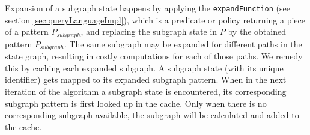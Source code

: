 Expansion of a subgraph state happens by applying the \texttt{expandFunction} (see section \ref{sec:queryLanguageImpl}), which is a predicate or policy returning a piece of a pattern $P_{subgraph}$, and replacing the subgraph state in $P$ by the obtained pattern $P_{subgraph}$. The same subgraph may be expanded for different paths in the state graph, resulting in costly computations for each of those paths. We remedy this by caching each expanded subgraph. A subgraph state (with its unique identifier) gets mapped to its expanded subgraph pattern. When in the next iteration of the algorithm a subgraph state is encountered, its corresponding subgraph pattern is first looked up in the cache. Only when there is no corresponding subgraph available, the subgraph will be calculated and added to the cache.




